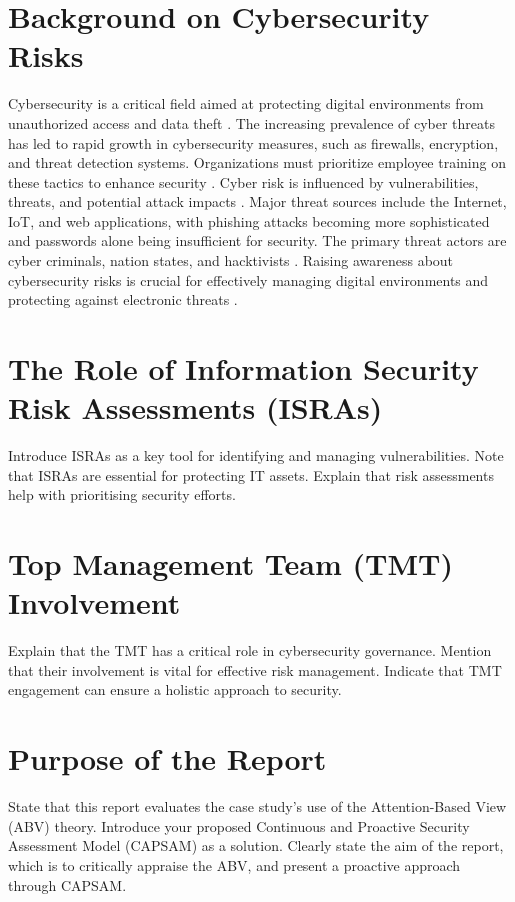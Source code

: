 \section{Background on Cybersecurity Risks}
Cybersecurity is a critical field aimed at protecting digital environments from unauthorized access and data theft \citep{mijwil2023exploring}. The increasing prevalence of cyber threats has led to rapid growth in cybersecurity measures, such as firewalls, encryption, and threat detection systems. Organizations must prioritize employee training on these tactics to enhance security \citep{mijwil2023exploring}. Cyber risk is influenced by vulnerabilities, threats, and potential attack impacts \citep{prasad2020cyber}. Major threat sources include the Internet, IoT, and web applications, with phishing attacks becoming more sophisticated and passwords alone being insufficient for security. The primary threat actors are cyber criminals, nation states, and hacktivists \citep{prasad2020cyber}. Raising awareness about cybersecurity risks is crucial for effectively managing digital environments and protecting against electronic threats \citep{mijwil2023exploring}.

\section{The Role of Information Security Risk Assessments (ISRAs)}
Introduce ISRAs as a key tool for identifying and managing vulnerabilities. Note that ISRAs are essential for protecting IT assets. Explain that risk assessments help with prioritising security efforts.

\section{Top Management Team (TMT) Involvement}
Explain that the TMT has a critical role in cybersecurity governance. Mention that their involvement is vital for effective risk management. Indicate that TMT engagement can ensure a holistic approach to security.

\section{Purpose of the Report}
State that this report evaluates the case study's use of the Attention-Based View (ABV) theory. Introduce your proposed Continuous and Proactive Security Assessment Model (CAPSAM) as a solution. Clearly state the aim of the report, which is to critically appraise the ABV, and present a proactive approach through CAPSAM.
